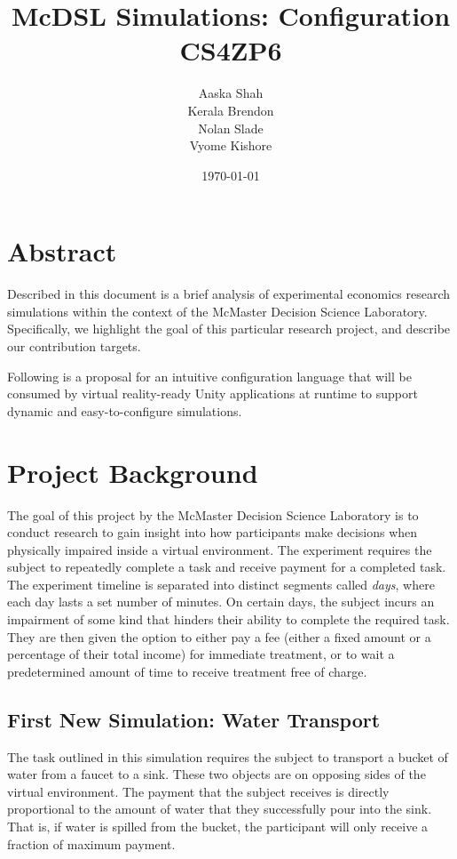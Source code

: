 \documentclass{article}
\title{\textbf{McDSL Simulations: Configuration}\\CS4ZP6}
\author{Aaska Shah\\Kerala Brendon\\Nolan Slade\\Vyome Kishore}
\date{\today}
\begin{document}
\maketitle

\section*{Abstract}

Described in this document is a brief analysis of experimental economics research simulations within the context of the McMaster Decision Science Laboratory. Specifically, we highlight the goal of this particular research project, and describe our contribution targets.

Following is a proposal for an intuitive configuration language that will be consumed by virtual reality-ready Unity applications at runtime to support dynamic and easy-to-configure simulations.

\section*{Project Background}
The goal of this project by the McMaster Decision Science Laboratory is to conduct research to gain insight into how participants make decisions when physically impaired inside a virtual environment. The experiment requires the subject to repeatedly complete a task and receive payment for a completed task. The experiment timeline is separated into distinct segments called \textit{days}, where each day lasts a set number of minutes. On certain days, the subject incurs an impairment of some kind that hinders their ability to complete the required task. They are then given the option to either pay a fee (either a fixed amount or a percentage of their total income) for immediate treatment, or to wait a predetermined amount of time to receive treatment free of charge.

\subsection*{First New Simulation: Water Transport}

The task outlined in this simulation requires the subject to transport a bucket of water from a faucet to a sink. These two objects are on opposing sides of the virtual environment. The payment that the subject receives is directly proportional to the amount of water that they successfully pour into the sink. That is, if water is spilled from the bucket, the participant will only receive a fraction of maximum payment.
\end{document}
